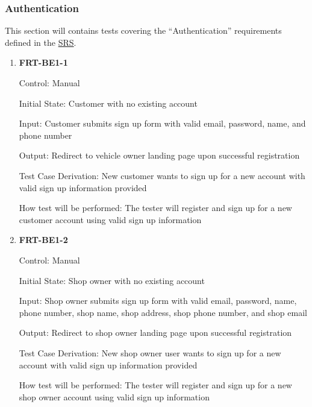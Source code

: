 \documentclass[12pt, titlepage]{article}
\begin{document}


\subsubsection{Authentication}
This section will contains tests covering the ``Authentication'' requirements defined in the
\href{https://github.com/arkinmodi/project-sayyara/blob/main/docs/SRS/SRS.pdf}{SRS}.

\begin{enumerate}

	\item \textbf{FRT-BE1-1}

	      Control: Manual

	      Initial State: Customer with no existing account

	      Input: Customer submits sign up form with valid email, password, name, and phone number

	      Output: Redirect to vehicle owner landing page upon successful registration

	      Test Case Derivation: New customer wants to sign up for a new account with valid sign up
	      information provided

	      How test will be performed: The tester will register and sign up for a new customer account using
	      valid sign up information

	\item \textbf{FRT-BE1-2}

	      Control: Manual

	      Initial State: Shop owner with no existing account

	      Input: Shop owner submits sign up form with valid email, password, name, phone number, shop name,
	      shop address, shop phone number, and shop email

	      Output: Redirect to shop owner landing page upon successful registration

	      Test Case Derivation: New shop owner user wants to sign up for a new account with valid sign up
	      information provided

	      How test will be performed: The tester will register and sign up for a new shop owner account using
	      valid sign up information


\end{enumerate}
\end{document}
